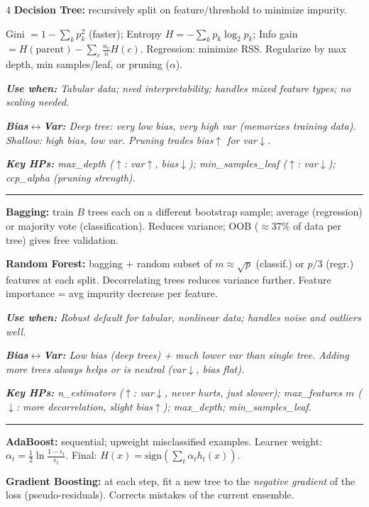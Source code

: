 \documentclass[6.5pt,landscape]{article}
\makeatletter
\renewcommand{\section}{\@startsection{section}{1}{\z@}{0.3ex plus 0.05ex}{0.05ex}{\normalfont\scriptsize\bfseries\itshape}}
\newcommand{\rl}{\vspace{-1.5pt}\par\noindent\rule{\columnwidth}{0.15pt}\par\vspace{-1pt}}
\newcommand{\use}[1]{\textit{\textbf{Use when:} #1}}
\newcommand{\bv}[1]{\textit{\textbf{Bias$\leftrightarrow$Var:} #1}}
\newcommand{\hp}[1]{\textit{\textbf{Key HPs:} #1}}
\makeatother
\begin{document}
\begin{multicols*}{4}
\section{Trees \& Ensembles}
\noindent\textbf{Decision Tree:} recursively split on feature/threshold to minimize impurity.\par
Gini $=1-\sum_k p_k^2$ (faster); Entropy $H=-\sum_k p_k\log_2 p_k$; Info gain$=H(\text{parent})-\sum_c\frac{n_c}{n}H(c)$. Regression: minimize RSS. Regularize by max depth, min samples/leaf, or pruning ($\alpha$).\par
\use{Tabular data; need interpretability; handles mixed feature types; no scaling needed.}\par
\bv{Deep tree: very low bias, very high var (memorizes training data). Shallow: high bias, low var. Pruning trades bias$\uparrow$ for var$\downarrow$.}\par
\hp{max\_depth ($\uparrow$: var$\uparrow$, bias$\downarrow$); min\_samples\_leaf ($\uparrow$: var$\downarrow$); ccp\_alpha (pruning strength).}\par
\rl
\noindent\textbf{Bagging:} train $B$ trees each on a different bootstrap sample; average (regression) or majority vote (classification). Reduces variance; OOB ($\approx37\%$ of data per tree) gives free validation.\par
\textbf{Random Forest:} bagging $+$ random subset of $m\approx\sqrt{p}$ (classif.) or $p/3$ (regr.) features at each split. Decorrelating trees reduces variance further. Feature importance = avg impurity decrease per feature.\par
\use{Robust default for tabular, nonlinear data; handles noise and outliers well.}\par
\bv{Low bias (deep trees) + much lower var than single tree. Adding more trees always helps or is neutral (var$\downarrow$, bias flat).}\par
\hp{n\_estimators ($\uparrow$: var$\downarrow$, never hurts, just slower); max\_features $m$ ($\downarrow$: more decorrelation, slight bias$\uparrow$); max\_depth; min\_samples\_leaf.}\par
\rl
\noindent\textbf{AdaBoost:} sequential; upweight misclassified examples. Learner weight: $\alpha_t=\frac{1}{2}\ln\frac{1-\epsilon_t}{\epsilon_t}$. Final: $H(x)=\text{sign}(\sum_t\alpha_t h_t(x))$.\par
\textbf{Gradient Boosting:} at each step, fit a new tree to the \emph{negative gradient} of the loss (pseudo-residuals). Corrects mistakes of the current ensemble.\par

\end{multicols*}
\end{document}
